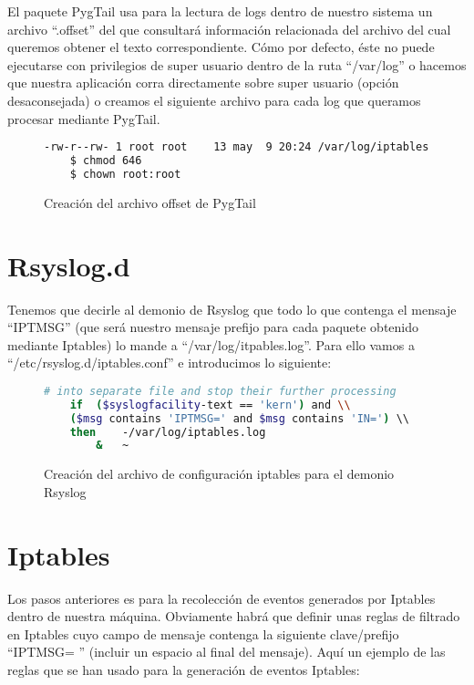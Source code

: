 El paquete PygTail usa para la lectura de logs dentro de nuestro sistema un archivo ``.offset'' del que consultará información relacionada del archivo del cual queremos obtener el texto correspondiente. Cómo por defecto, éste no puede ejecutarse con privilegios de super usuario dentro de la ruta ``/var/log'' o hacemos que nuestra aplicación corra directamente sobre super usuario (opción desaconsejada) o creamos el siguiente archivo para cada log que queramos procesar mediante PygTail.

\begin{figure}[H]
  \begin{lstlisting}[language=bash]
    -rw-r--rw- 1 root root    13 may  9 20:24 /var/log/iptables.log.offset
    $ chmod 646
    $ chown root:root
  \end{lstlisting}
  \caption{Creación del archivo offset de PygTail}
\end{figure}

\section{Rsyslog.d}

Tenemos que decirle al demonio de Rsyslog que todo lo que contenga el mensaje ``IPTMSG'' (que será nuestro mensaje prefijo para cada paquete obtenido mediante Iptables) lo mande a ``/var/log/itpables.log''. Para ello vamos a ``/etc/rsyslog.d/iptables.conf'' e introducimos lo siguiente:

\begin{figure}[H]
  \begin{lstlisting}[language=bash]
    # into separate file and stop their further processing
    if  ($syslogfacility-text == 'kern') and \\
    ($msg contains 'IPTMSG=' and $msg contains 'IN=') \\
    then    -/var/log/iptables.log
        &   ~
  \end{lstlisting}
  \caption{Creación del archivo de configuración iptables para el demonio Rsyslog}
\end{figure}

\section{Iptables}

Los pasos anteriores es para la recolección de eventos generados por Iptables dentro de nuestra máquina. Obviamente habrá que definir unas reglas de filtrado en Iptables cuyo campo de mensaje contenga la siguiente clave/prefijo ``IPTMSG= '' (incluir un espacio al final del mensaje). Aquí un ejemplo de las reglas que se han usado para la generación de eventos Iptables:

